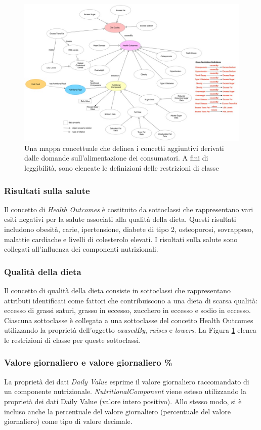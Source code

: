 \begin{figure}[H]
    \centering
    \includegraphics[width=\textwidth]{res/WS_05_Concetti_Aggiuntivi.jpg}
    \caption{Una mappa concettuale che delinea i concetti aggiuntivi derivati dalle domande sull'alimentazione dei consumatori. A fini di leggibilità, sono elencate le definizioni delle restrizioni di classe}
     \label{fig:ConcettiAggiuntivi}
\end{figure}

\subsubsection{Risultati sulla salute}
Il concetto di \emph{Health Outcomes} è costituito da sottoclassi che rappresentano vari esiti negativi per la salute associati alla qualità della dieta. Questi risultati includono obesità, carie, ipertensione, diabete di tipo 2, osteoporosi, sovrappeso, malattie cardiache e livelli di colesterolo elevati. I risultati sulla salute sono collegati all'influenza dei componenti nutrizionali.

\subsubsection{Qualità della dieta}
Il concetto di qualità della dieta consiste in sottoclassi che rappresentano attributi identificati come fattori che contribuiscono a una dieta di scarsa qualità: eccesso di grassi saturi, grasso in eccesso, zucchero in eccesso e sodio in eccesso. Ciascuna sottoclasse è collegata a una sottoclasse del concetto Health Outcomes utilizzando la proprietà dell'oggetto \emph{causedBy}, \emph{raises} e \emph{lowers}. La Figura \ref{fig:ConcettiAggiuntivi} elenca le restrizioni di classe per queste sottoclassi.

\subsubsection{Valore giornaliero e valore giornaliero \%}
La proprietà dei dati \emph{Daily Value} esprime il valore giornaliero raccomandato di un componente nutrizionale. \emph{NutritionalComponent} viene esteso utilizzando la proprietà dei dati Daily Value (valore intero positivo). Allo stesso modo, si è incluso anche la percentuale del valore giornaliero (percentuale del valore giornaliero) come tipo di valore decimale.